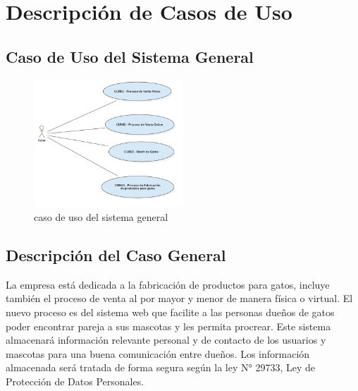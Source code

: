 \documentclass{article}
\begin{document}
\section{Descripción de Casos de Uso}
\subsection{Caso de Uso del Sistema General}
\begin{figure}[h]
    \begin{center}
        \includegraphics[width=0.5\textwidth]{images/Caso de uso general v2.png}
        \caption{caso de uso del sistema general}
    \end{center}
\end{figure}
\subsection{Descripción del Caso General}
La empresa está dedicada a la fabricación de productos para gatos, incluye también el proceso de venta al por mayor y menor de manera física o virtual.
El nuevo proceso es del sistema web que facilite a las personas dueños de gatos poder encontrar pareja a sus mascotas y les permita procrear. Este sistema almacenará información relevante personal y de contacto de los usuarios y mascotas para una buena comunicación entre dueños. Los información almacenada será tratada de forma segura según la ley N° 29733, Ley de Protección de Datos Personales.
\clearpage
\end{document}
